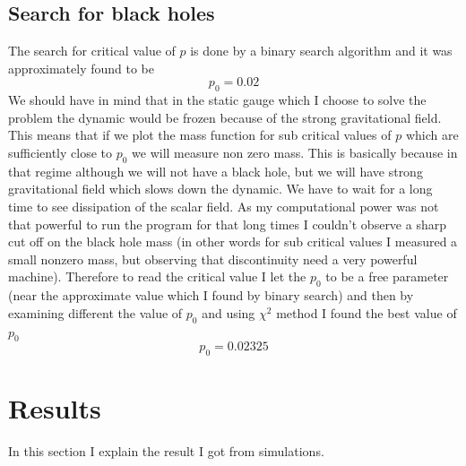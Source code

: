 \documentclass[a4paper,11pt]{article}
\begin{document}
\subsection{Search for black holes}
The search for critical value of $p$ is done by a binary search algorithm and it was approximately found to be
\begin{equation}
	p_0=0.02
\end{equation}
We should have in mind that in the static gauge which I choose to solve the problem the dynamic would be frozen because of the strong gravitational field. This means that if we plot the mass function for sub critical values of $p$ which are sufficiently close to $p_0$ we will measure non zero mass. This is basically because in that regime although we will not have a black hole, but we will have strong gravitational field which slows down the dynamic. We have to wait for a long time to see dissipation of the scalar field. As my computational power was not that powerful to run the program for that long times I couldn't  observe a sharp cut off on the  black hole mass (in other words for sub critical values I measured a small nonzero mass, but observing that discontinuity need a very powerful machine). Therefore to read the critical value I let the $p_0$ to be a free parameter (near the approximate value which I found by binary search) and then by examining different  the value of $p_0$ and using $\chi^2$ method I found the best value of $p_0$
\begin{equation}
\boxed{p_0=0.02325}
\end{equation}
\section{Results}
In this section I explain the result I got from simulations.
\end{document}

